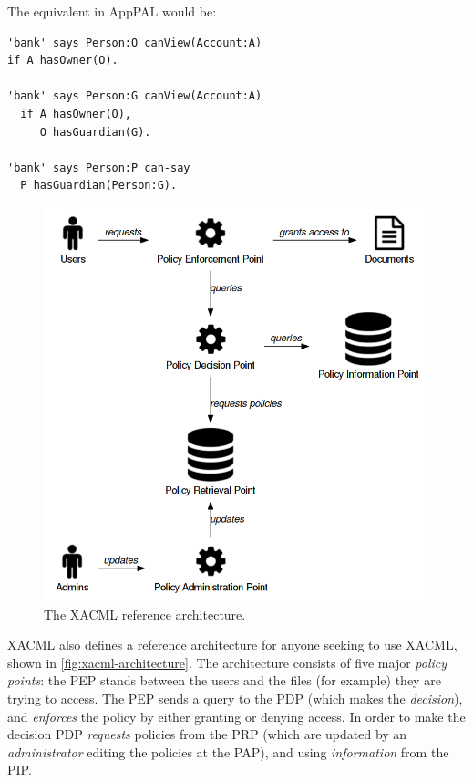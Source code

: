 \documentclass[thesis.tex]{subfiles}
\begin{document}
The equivalent in AppPAL would be:

\begin{lstlisting}
'bank' says Person:O canView(Account:A)
if A hasOwner(O).

'bank' says Person:G canView(Account:A)
  if A hasOwner(O),
     O hasGuardian(G).

'bank' says Person:P can-say
  P hasGuardian(Person:G).
\end{lstlisting}

\begin{figure}
  \centering
  \includegraphics[width=1.0\textwidth]{figures/xacml-architecture.png}
  \caption{The XACML reference architecture.}
  \label{fig:xacml-architecture}
\end{figure}

XACML also defines a reference architecture for anyone seeking to use XACML,
shown in \autoref{fig:xacml-architecture}. The architecture consists of five
major \emph{policy points}: the PEP stands between the users and the files (for
example) they are trying to access. The PEP sends a query to the PDP (which
makes the \emph{decision}), and \emph{enforces} the policy by either granting or
denying access. In order to make the decision PDP \emph{requests} policies from
the PRP (which are updated by an \emph{administrator} editing the policies at
the PAP), and using \emph{information} from the PIP. 
\end{document}
